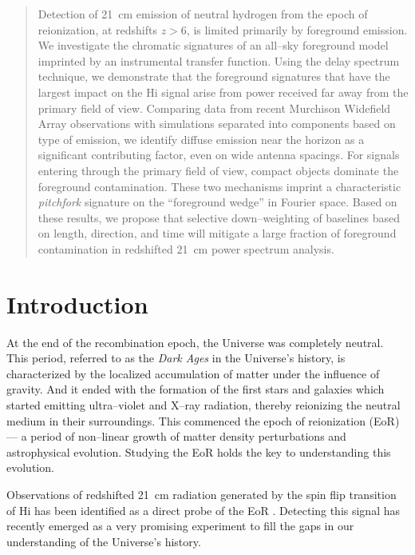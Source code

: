 \documentclass[preprint2,iop,numberedappendix]{emulateapj}
\begin{document}
\begin{abstract}

Detection of 21~cm emission of neutral hydrogen from the epoch of reionization, at redshifts $z>6$, is limited primarily by foreground emission.  We investigate the chromatic signatures of an all--sky foreground model imprinted by an instrumental transfer function.  Using the delay spectrum technique, we demonstrate that the foreground signatures that have the largest impact on the H{\sc i} signal arise from power received far away from the primary field of view. Comparing data from recent Murchison Widefield Array observations with simulations separated into components based on type of emission, we identify diffuse emission near the horizon as a significant contributing factor, even on wide antenna spacings. For signals entering through the primary field of view, compact objects dominate the foreground contamination. These two mechanisms imprint a characteristic {\it pitchfork} signature on the ``foreground wedge'' in Fourier space.  Based on these results, we propose that selective down--weighting of baselines based on length, direction, and time will mitigate a large fraction of foreground contamination in redshifted 21~cm power spectrum analysis.

\end{abstract}
 

\section{Introduction}\label{intro}

At the end of the recombination epoch, the Universe was completely neutral. This period, referred to as the {\it Dark Ages} in the Universe's history, is characterized by the localized accumulation of matter under the influence of gravity. And it ended with the formation of the first stars and galaxies which started emitting ultra--violet and X--ray radiation, thereby reionizing the neutral medium in their surroundings. This commenced the epoch of reionization (EoR) --- a period of non--linear growth of matter density perturbations and astrophysical evolution. Studying the EoR holds the key to understanding this evolution. 

Observations of redshifted 21~cm radiation generated by the spin flip transition of H{\sc i} has been identified as a direct probe of the EoR \citep{sun72,sco90,mad97,toz00,ili02}. Detecting this signal has recently emerged as a very promising experiment to fill the gaps in our understanding of the Universe's history.  
\end{document}
